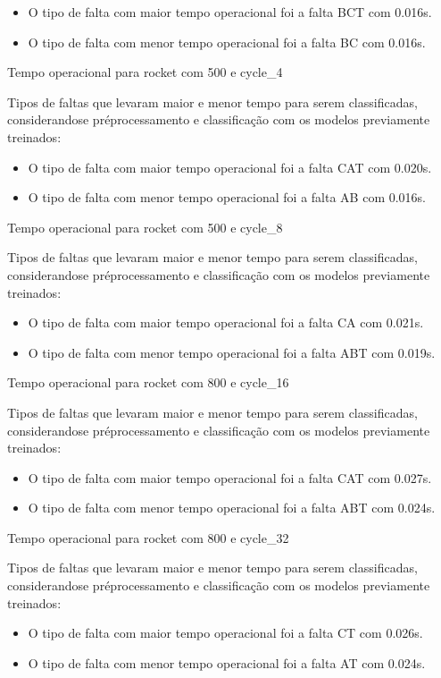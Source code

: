 \begin{itemize}
\item O tipo de falta com maior tempo operacional foi a falta BCT com 0.016s.
\item O tipo de falta com menor tempo operacional foi a falta BC com 0.016s.
\end{itemize}
Tempo operacional para rocket com 500 e cycle_4
\item Tipos de faltas que levaram maior e menor tempo para serem classificadas, considerando\hyph se pré\hyph processamento e classificação com os modelos previamente treinados:
\begin{itemize}
\item O tipo de falta com maior tempo operacional foi a falta CAT com 0.020s.
\item O tipo de falta com menor tempo operacional foi a falta AB com 0.016s.
\end{itemize}
Tempo operacional para rocket com 500 e cycle_8
\item Tipos de faltas que levaram maior e menor tempo para serem classificadas, considerando\hyph se pré\hyph processamento e classificação com os modelos previamente treinados:
\begin{itemize}
\item O tipo de falta com maior tempo operacional foi a falta CA com 0.021s.
\item O tipo de falta com menor tempo operacional foi a falta ABT com 0.019s.
\end{itemize}
Tempo operacional para rocket com 800 e cycle_16
\item Tipos de faltas que levaram maior e menor tempo para serem classificadas, considerando\hyph se pré\hyph processamento e classificação com os modelos previamente treinados:
\begin{itemize}
\item O tipo de falta com maior tempo operacional foi a falta CAT com 0.027s.
\item O tipo de falta com menor tempo operacional foi a falta ABT com 0.024s.
\end{itemize}
Tempo operacional para rocket com 800 e cycle_32
\item Tipos de faltas que levaram maior e menor tempo para serem classificadas, considerando\hyph se pré\hyph processamento e classificação com os modelos previamente treinados:
\begin{itemize}
\item O tipo de falta com maior tempo operacional foi a falta CT com 0.026s.
\item O tipo de falta com menor tempo operacional foi a falta AT com 0.024s.
\end{itemize}
